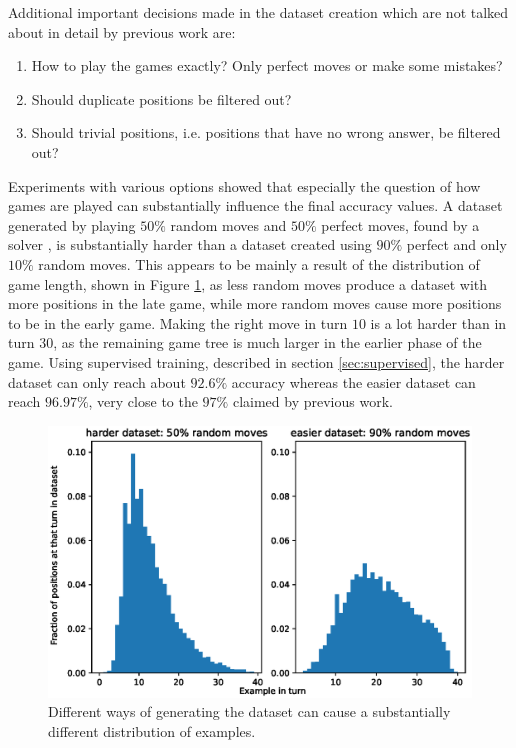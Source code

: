 \documentclass[12pt,onecolumn,oneside,titlepage]{article}
\begin{document}
Additional important decisions made in the dataset creation which are not talked about in detail by previous work are:

\begin{enumerate}
 \item How to play the games exactly? Only perfect moves or make some mistakes?
 \item Should duplicate positions be filtered out?
 \item Should trivial positions, i.e. positions that have no wrong answer, be filtered out?
\end{enumerate}

Experiments with various options showed that especially the question of how games are played can substantially influence the final accuracy values. A dataset generated by playing $50\%$ random moves and $50\%$ perfect moves, found
by a solver \cite{pascalsolver, pascalsolvergithub}, is substantially harder than a dataset created using
$90\%$ perfect and only $10\%$ random moves. This appears to be mainly a result of the distribution of game length, shown in Figure \ref{fig:dataset_hist}, as less random moves produce a dataset with more positions in the late game, while more random moves cause more positions to be in the early game.
Making the right move in turn $10$ is a lot harder than in turn $30$, as the remaining game tree is much larger in the earlier phase of the game. Using supervised training, described in section \ref{sec:supervised}, the harder dataset can only reach about $92.6\%$ accuracy whereas the easier dataset
can reach $96.97\%$, very close to the $97\%$ claimed by previous work. 

\begin{figure}[H]
\centering
\includegraphics[clip,width=\columnwidth]{dataset_hist}
\caption{Different ways of generating the dataset can cause a substantially different distribution of examples.}
\label{fig:dataset_hist}
\end{figure}
\end{document}
